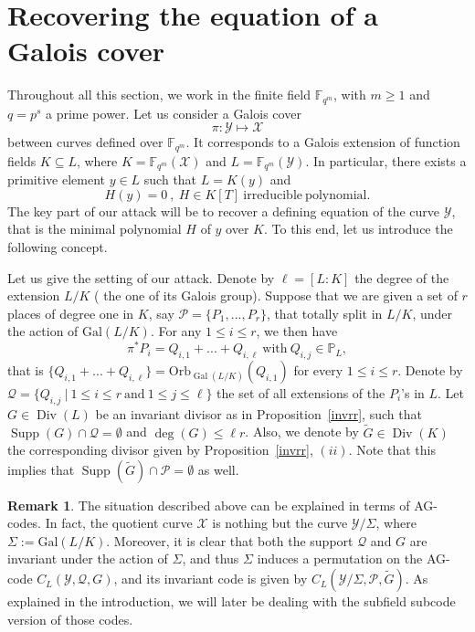 \documentclass[10pt]{article}
\theoremstyle{definition}
\theoremstyle{definition}
\newtheorem{rq1}[thm]{Remark}
\theoremstyle{definition}
\newcommand{\s}{\vspace{0.3cm}}
\newcommand{\PP}{\mathbb{P}}
\newcommand{\fqm}{\mathbb{F}_{q^m}}
\newcommand{\su}{\subseteq}
\newcommand{\X}{\mathcal{X}}
\newcommand{\Y}{\mathcal{Y}}
\newcommand{\PR}{\mathcal{P}}
\newcommand{\QR}{\mathcal{Q}}
\newcommand{\Div}{\operatorname{Div}}
\newcommand{\Supp}{\operatorname{Supp}}
\newcommand{\Gal}{\operatorname{Gal}}
\begin{document}
\s

\section{Recovering the equation of a Galois cover} \label{sectionfour}


\s

Throughout all this section, we work in the finite field $\fqm$, with $m\geq 1$ and $q=p^s$ a prime power. Let us consider a Galois cover 
\[\pi : \Y \longmapsto \X\]
between curves defined over $\fqm$. It corresponds to a Galois extension of function fields $K \su L$,
where $K=\fqm(\X)$ and $L=\fqm(\Y)$. In particular, there exists a primitive element $y \in L$ such that $L=K(y)$ and
\[ H(y)=0 \ , \ H \in K[T] \ \mathrm{irreducible \ polynomial.}\]
The key part of our attack will be to recover a defining equation of the curve $\Y$, that is the minimal polynomial $H$ of $y$ over $K$. To this end, let us introduce the following concept.

\s

Let us give the setting of our attack. Denote by $\ell=[L:K]$ the degree of the extension $L/K$ (\color{purple} the one of its Galois group\color{black}). Suppose that we are given a set of $r$ places of degree one in $K$, say $\PR = \{P_1,...,P_r\}$, that totally split in $L/K$, \color{purple} under the action of $\mathrm{Gal}(L/K)$\color{black}. For any $1 \leq i \leq r$, we then have
\[\pi^*P_i = Q_{i,1} + ... + Q_{i,\ell} \ \textrm{with}  \ Q_{i,j} \in \PP_L,\]
\color{purple} that is $\{Q_{i,1} + ... + Q_{i,\ell}\} = \mathrm{Orb}_{\Gal(L/K)}(Q_{i,1})$ for every $1\leq i\leq r$\color{black}. Denote by $\QR = \{Q_{i,j} \ | \ 1 \leq i \leq r \ \mathrm{and} \ 1 \leq j \leq \ell\}$ the set of all extensions of the $P_i$'s in $L$. 
\color{purple}
Let $G \in \Div(L)$ be an invariant divisor as in Proposition~\ref{invrr}, such that $\Supp(G) \cap \QR = \emptyset$ and $\deg(G) \leq \ell r$. Also, we denote by $\tilde{G} \in \Div(K)$ the corresponding divisor given by Proposition~\ref{invrr}, $(ii)$.
\color{black}
Note that this implies that $\Supp(\tilde{G}) \cap \PR = \emptyset$ as well. 

\s
\color{purple}
\begin{rq1}
The situation described above can be explained in terms of AG-codes. In fact, the quotient curve $\X$ is nothing but the curve $\Y/\Sigma$, where $\Sigma := \mathrm{Gal}(L/K)$. Moreover, it is clear that both the support $\QR$ and $G$ are invariant under the action of $\Sigma$, and thus $\Sigma$ induces a permutation on the AG-code $C_L(\Y,\QR,G)$, and its invariant code is given by $C_L(\Y/\Sigma,\PR,\tilde{G})$. As explained in the introduction, we will later be dealing with the subfield subcode version of those codes. 
\end{rq1}
\color{black}
\end{document}
